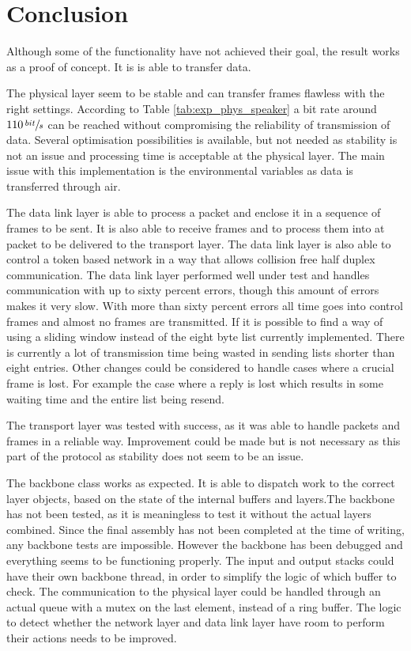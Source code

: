 \chapter{Conclusion}\label{chap:conclusion}
Although some of the functionality have not achieved their goal, the result works as a proof of concept. It is is able to transfer data.

The physical layer seem to be stable and can transfer frames flawless with the right settings. According to Table \ref{tab:exp_phys_speaker} a bit rate around $110\,\sfrac{bit}{s}$ can be reached without compromising the reliability of transmission of data. Several optimisation possibilities is available, but not needed as stability is not an issue and processing time is acceptable at the physical layer. The main issue with this implementation is the environmental variables as data is transferred through air.

The data link layer is able to process a packet and enclose it in a sequence of frames to be sent. It is also able to receive frames and to process them into at packet to be delivered to the transport layer. The data link layer is also able to control a token based network in a way that allows collision free half duplex communication. The data link layer performed well under test and handles communication with up to sixty percent errors, though this amount of errors makes it very slow. With more than sixty percent errors all time goes into control frames and almost no frames are transmitted.
If it is possible to find a way of using a sliding window instead of the eight byte list currently implemented. There is currently a lot of transmission time being wasted in sending lists shorter than eight entries. Other changes could be considered to handle cases where a crucial frame is lost. For example the case where a reply is lost which results in some waiting time and the entire list being resend.

The transport layer was tested with success, as it was able to handle packets and frames in a reliable way. Improvement could be made but is not necessary as this part of the protocol as stability does not seem to be an issue.

The backbone class works as expected. It is able to dispatch work to the correct layer objects, based on the state of the internal buffers and layers.The backbone has not been tested, as it is meaningless to test it without the actual layers combined. Since the final assembly has not been completed at the time of writing, any backbone tests are impossible. However the backbone has been debugged and everything seems to be functioning properly.
The input and output stacks could have their own backbone thread, in order to simplify the logic of which buffer to check. The communication to the physical layer could be handled through an actual queue with a mutex on the last element, instead of a ring buffer. The logic to detect whether the network layer and data link layer have room to perform their actions needs to be improved.

